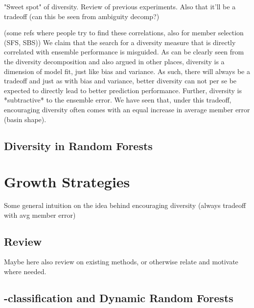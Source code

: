 \documentclass[
    a4paper, %
	fontsize=10pt, %
	twoside=false, %
]{kaobook}
\begin{document}

"Sweet spot" of diversity. Review of previous experiments. 
Also that it'll be a tradeoff (can this be seen from ambiguity decomp?)

(some refs where people try to find these correlations, also for member selection (SFS, SBS))
We claim that the search for a diversity measure that is directly correlated with ensemble performance is misguided. As can be clearly seen from the diversity decomposition and also argued in other places, diversity is a dimension of model fit, just like bias and variance. As such, there will always be a tradeoff and just as with bias and variance, better diversity can not per se be expected to directly lead to better prediction performance. Further, diversity is *subtractive* to the ensemble error. We have seen that, under this tradeoff, encouraging diversity often comes with an equal increase in average member error (basin shape). 

\section{Diversity in Random Forests}







\chapter{Growth Strategies}

Some general intuition on the idea behind encouraging diversity (always tradeoff with avg member error)

\section{Review} 
Maybe here also review on existing methods, or otherwise relate and motivate where needed.


\section{\zeroone-classification and Dynamic Random Forests}
\label{sec:dynamic-random-forests}

\end{document}
